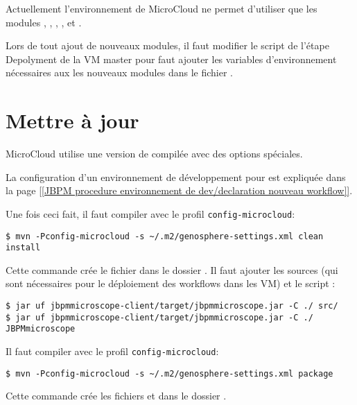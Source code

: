 Actuellement l'environnement de MicroCloud ne permet d'utiliser que les modules , , , ,  et .
\newline

\begin{mycolorbox}
    Lors de tout ajout de nouveaux modules, il faut modifier le script de l'étape Depolyment de la VM master
    pour faut ajouter les variables d'environnement nécessaires aux les nouveaux modules
    dans le fichier .
\end{mycolorbox}

\section{Mettre à jour } \label{sec:nouvelle_version_jbpmmicroscope}

MicroCloud utilise une version de  compilée avec des options spéciales.

La configuration d'un environnement de développement pour  est expliquée
dans la page \href{https://intranet.genoscope.cns.fr/agc/redmine/projects/microscopeworkflow/wiki/JBPMprocedure}{[[JBPM procedure environnement de dev/declaration nouveau workflow]]}.

Une fois ceci fait, il faut compiler  avec le profil \texttt{config-microcloud}:
\begin{lstlisting}[style=bash]
$ mvn -Pconfig-microcloud -s ~/.m2/genosphere-settings.xml clean install
\end{lstlisting}
Cette commande crée le fichier  dans le dossier .
Il faut ajouter les sources (qui sont nécessaires pour le déploiement des workflows dans les VM) et le script :
\begin{lstlisting}[style=bash]
$ jar uf jbpmmicroscope-client/target/jbpmmicroscope.jar -C ./ src/
$ jar uf jbpmmicroscope-client/target/jbpmmicroscope.jar -C ./ JBPMmicroscope
\end{lstlisting}
\bigskip

Il faut compiler  avec le profil \texttt{config-microcloud}:
\begin{lstlisting}[style=bash]
$ mvn -Pconfig-microcloud -s ~/.m2/genosphere-settings.xml package
\end{lstlisting}
Cette commande crée les fichiers  et 
dans le dossier .
\bigskip

